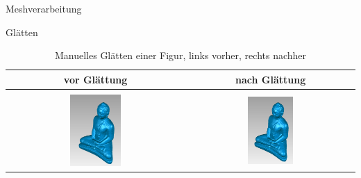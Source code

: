 \begin{frame}{Meshverarbeitung}

\begin{block}{Glätten}
\begin{table}[h]
	\begin{center}
		\begin{tabular}{| c | c |}
			\hline
			vor Glättung & nach Glättung \\
			\hline
			\hline
			& \\
			\includegraphics[width=0.30\textwidth]{./Images/GeomagicBudhaPictures/Budha_Presmooth.PNG} & \includegraphics[width=0.285\textwidth]{./Images/GeomagicBudhaPictures/Budha_Postsmooth.PNG} \\
			\hline					  
		\end{tabular}
	\end{center}
	\caption{Manuelles Glätten einer Figur, links vorher, rechts nachher}
	\label{tab:BudhaSmooth}
\end{table}
\end{block}

\end{frame}